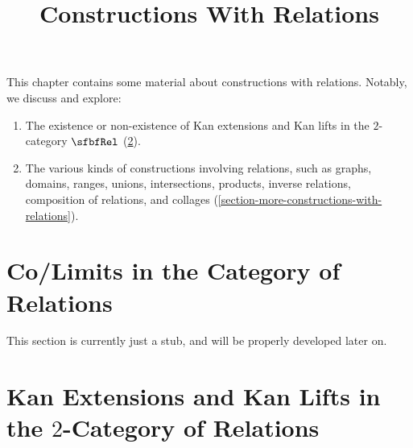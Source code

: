 

%



\title{Constructions With Relations}

\maketitle

\label{section-phantom}

This chapter contains some material about constructions with relations. Notably, we discuss and explore:
\begin{enumerate}
    \item\label{constructions-with-relations-introduction-item-1}The existence or non-existence of Kan extensions and Kan lifts in the $2$-category $\sfbfRel$ (\cref{section-kan-extensions-and-kan-lifts-in-the-2-category-of-relations}).
    \item\label{constructions-with-relations-introduction-item-2}The various kinds of constructions involving relations, such as graphs, domains, ranges, unions, intersections, products, inverse relations, composition of relations, and collages (\cref{section-more-constructions-with-relations}).
\end{enumerate}

\ChapterTableOfContents

\section{Co/Limits in the Category of Relations}\label{section-co-limits-in-the-category-of-relations}
This section is currently just a stub, and will be properly developed later on.
\section{Kan Extensions and Kan Lifts in the $2$-Category of Relations}\label{section-kan-extensions-and-kan-lifts-in-the-2-category-of-relations}
